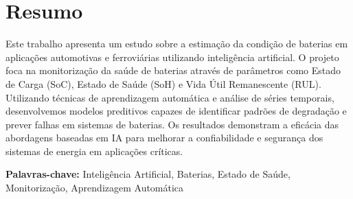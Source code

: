 
\chapter*{Resumo}

Este trabalho apresenta um estudo sobre a estimação da condição de baterias em aplicações automotivas e ferroviárias utilizando inteligência artificial. O projeto foca na monitorização da saúde de baterias através de parâmetros como Estado de Carga (SoC), Estado de Saúde (SoH) e Vida Útil Remanescente (RUL). Utilizando técnicas de aprendizagem automática e análise de séries temporais, desenvolvemos modelos preditivos capazes de identificar padrões de degradação e prever falhas em sistemas de baterias. Os resultados demonstram a eficácia das abordagens baseadas em IA para melhorar a confiabilidade e segurança dos sistemas de energia em aplicações críticas.

\vfill

\noindent
\textbf{Palavras-chave:} Inteligência Artificial, Baterias, Estado de Saúde, Monitorização, Aprendizagem Automática

